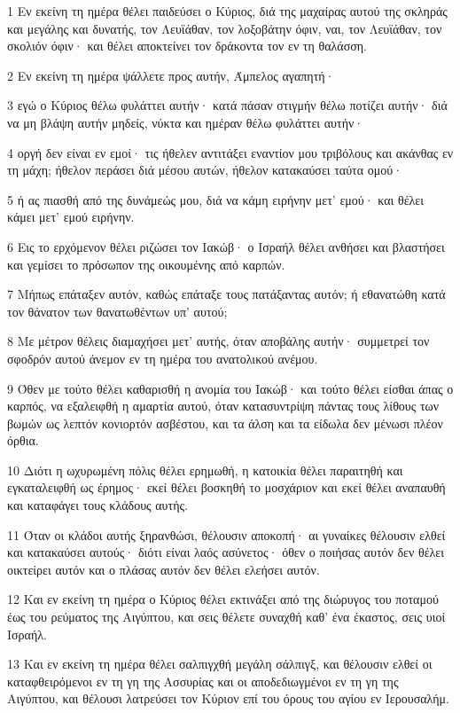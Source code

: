 \par 1 Εν εκείνη τη ημέρα θέλει παιδεύσει ο Κύριος, διά της μαχαίρας αυτού της σκληράς και μεγάλης και δυνατής, τον Λευϊάθαν, τον λοξοβάτην όφιν, ναι, τον Λευϊάθαν, τον σκολιόν όφιν· και θέλει αποκτείνει τον δράκοντα τον εν τη θαλάσση.
\par 2 Εν εκείνη τη ημέρα ψάλλετε προς αυτήν, Άμπελος αγαπητή·
\par 3 εγώ ο Κύριος θέλω φυλάττει αυτήν· κατά πάσαν στιγμήν θέλω ποτίζει αυτήν· διά να μη βλάψη αυτήν μηδείς, νύκτα και ημέραν θέλω φυλάττει αυτήν·
\par 4 οργή δεν είναι εν εμοί· τις ήθελεν αντιτάξει εναντίον μου τριβόλους και ακάνθας εν τη μάχη; ήθελον περάσει διά μέσου αυτών, ήθελον κατακαύσει ταύτα ομού·
\par 5 ή ας πιασθή από της δυνάμεώς μου, διά να κάμη ειρήνην μετ' εμού· και θέλει κάμει μετ' εμού ειρήνην.
\par 6 Εις το ερχόμενον θέλει ριζώσει τον Ιακώβ· ο Ισραήλ θέλει ανθήσει και βλαστήσει και γεμίσει το πρόσωπον της οικουμένης από καρπών.
\par 7 Μήπως επάταξεν αυτόν, καθώς επάταξε τους πατάξαντας αυτόν; ή εθανατώθη κατά τον θάνατον των θανατωθέντων υπ' αυτού;
\par 8 Με μέτρον θέλεις διαμαχήσει μετ' αυτής, όταν αποβάλης αυτήν· συμμετρεί τον σφοδρόν αυτού άνεμον εν τη ημέρα του ανατολικού ανέμου.
\par 9 Όθεν με τούτο θέλει καθαρισθή η ανομία του Ιακώβ· και τούτο θέλει είσθαι άπας ο καρπός, να εξαλειφθή η αμαρτία αυτού, όταν κατασυντρίψη πάντας τους λίθους των βωμών ως λεπτόν κονιορτόν ασβέστου, και τα άλση και τα είδωλα δεν μένωσι πλέον όρθια.
\par 10 Διότι η ωχυρωμένη πόλις θέλει ερημωθή, η κατοικία θέλει παραιτηθή και εγκαταλειφθή ως έρημος· εκεί θέλει βοσκηθή το μοσχάριον και εκεί θέλει αναπαυθή και καταφάγει τους κλάδους αυτής.
\par 11 Όταν οι κλάδοι αυτής ξηρανθώσι, θέλουσιν αποκοπή· αι γυναίκες θέλουσιν ελθεί και κατακαύσει αυτούς· διότι είναι λαός ασύνετος· όθεν ο ποιήσας αυτόν δεν θέλει οικτείρει αυτόν και ο πλάσας αυτόν δεν θέλει ελεήσει αυτόν.
\par 12 Και εν εκείνη τη ημέρα ο Κύριος θέλει εκτινάξει από της διώρυγος του ποταμού έως του ρεύματος της Αιγύπτου, και σεις θέλετε συναχθή καθ' ένα έκαστος, σεις υιοί Ισραήλ.
\par 13 Και εν εκείνη τη ημέρα θέλει σαλπιγχθή μεγάλη σάλπιγξ, και θέλουσιν ελθεί οι καταφθειρόμενοι εν τη γη της Ασσυρίας και οι αποδεδιωγμένοι εν τη γη της Αιγύπτου, και θέλουσι λατρεύσει τον Κύριον επί του όρους του αγίου εν Ιερουσαλήμ.

